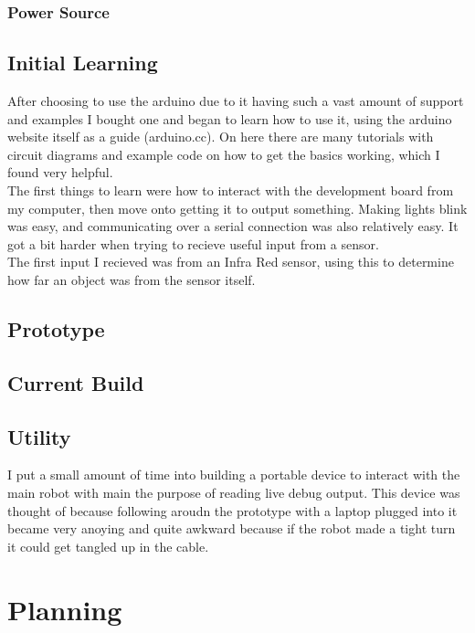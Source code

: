 \documentclass[11pt,fleqn,twoside]{article}
\begin{document}
\subsubsection{Power Source}


\subsection{Initial Learning}
After choosing to use the arduino due to it having such a vast amount of support and examples I bought one and began to learn how to use it, using the arduino website itself as a guide (arduino.cc).  On here there are many tutorials with circuit diagrams and example code on how to get the basics working, which I found very helpful.
\\The first things to learn were how to interact with the development board from my computer, then move onto getting it to output something.  Making lights blink was easy, and communicating over a serial connection was also relatively easy.  It got a bit harder when trying to recieve useful input from a sensor.
\\The first input I recieved was from an Infra Red sensor, using this to determine how far an object was from the sensor itself.

\subsection{Prototype}


\subsection{Current Build}

\subsection{Utility}
I put a small amount of time into building a portable device to interact with the main robot with main the purpose of reading live debug output.  This device was thought of because following aroudn the prototype with a laptop plugged into it became very anoying and quite awkward because if the robot made a tight turn it could get tangled up in the cable.

\section{Planning}
\end{document}
